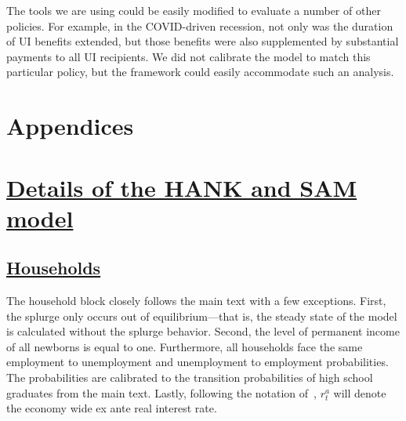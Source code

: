 \documentclass[qe,draft]{econsocart}
\theoremstyle{plain}
\theoremstyle{definition}
\begin{document}
The tools we are using could be easily modified to evaluate a number of other policies.  For example, in the COVID-driven recession, not only was the duration of UI benefits extended, but those benefits were also supplemented by substantial payments to all UI recipients.  We did not calibrate the model to match this particular policy, but the framework could easily accommodate such an analysis.


\clearpage


%
%
%




\clearpage
\section*{Appendices}

\appendix

\FloatBarrier

\section{\href{https://econ-ark.github.io/HAFiscal/\#sec:appendix-hank}{Details of the HANK and SAM model}}
\label{sec:appendix-hank} %


\subsection{\href{https://econ-ark.github.io/HAFiscal/\#sec:hank-households}{Households}}\label{sec:hank-households}

The household block closely follows the main text with a few exceptions. First, the splurge only occurs out of equilibrium---that is, the steady state of the model is calculated without the splurge behavior. Second, the level of permanent income of all newborns is equal to one. Furthermore, all households face the same employment to unemployment and unemployment to employment probabilities. The probabilities are calibrated to the transition probabilities of high school graduates from the main text. Lastly, following the notation of~\cite{arsJumpsHumps}, $r^{a}_{t}$ will denote the economy wide ex ante real interest rate.
\end{document}
